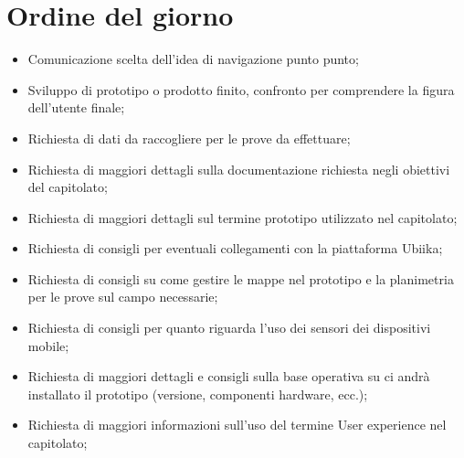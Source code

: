 \documentclass[../template.tex]{subfiles}
\begin{document}
\section{Ordine del giorno}
\begin{itemize}
	\item Comunicazione scelta dell'idea di navigazione punto punto;
	\item Sviluppo di prototipo o prodotto finito, confronto per comprendere la figura dell'utente finale;
	\item Richiesta di dati da raccogliere per le prove da effettuare;
	\item Richiesta di maggiori dettagli sulla documentazione richiesta negli obiettivi del capitolato;
	\item Richiesta di maggiori dettagli sul termine prototipo utilizzato nel capitolato;
	\item Richiesta di consigli per eventuali collegamenti con la piattaforma Ubiika;
	\item Richiesta di consigli su come gestire le mappe nel prototipo e la planimetria per le prove sul campo necessarie;
	\item Richiesta di consigli per quanto riguarda l'uso dei sensori dei dispositivi mobile;
	\item Richiesta di maggiori dettagli e consigli sulla base operativa su ci andrà installato il prototipo (versione, componenti hardware, ecc.);
	\item Richiesta di maggiori informazioni sull'uso del termine User experience nel capitolato;
\end{itemize}
\end{document}
